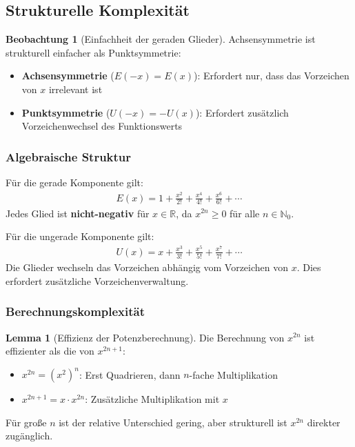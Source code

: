 ﻿\documentclass[a4paper,12pt]{article}
\theoremstyle{definition}
\newtheorem{lemma}{Lemma}
\newtheorem{beobachtung}{Beobachtung}
\begin{document}
\subsection{Strukturelle Komplexität}

\begin{beobachtung}[Einfachheit der geraden Glieder]
Achsensymmetrie ist strukturell einfacher als Punktsymmetrie:
\begin{itemize}
  \item[-] \textbf{Achsensymmetrie} ($E(-x) = E(x)$): Erfordert nur, dass das
           Vorzeichen von $x$ irrelevant ist
  \item[-] \textbf{Punktsymmetrie} ($U(-x) = -U(x)$): Erfordert zusätzlich
           Vorzeichenwechsel des Funktionswerts
\end{itemize}
\end{beobachtung}

\subsubsection{Algebraische Struktur}

Für die gerade Komponente gilt:
\begin{align}
  E(x) = 1 + \frac{x^2}{2!} + \frac{x^4}{4!} + \frac{x^6}{6!} + \cdots
\end{align}
Jedes Glied ist \textbf{nicht-negativ} für $x \in \mathbb{R}$, da
$x^{2n} \geq 0$ für alle $n \in \mathbb{N}_0$.

Für die ungerade Komponente gilt:
\begin{align}
  U(x) = x + \frac{x^3}{3!} + \frac{x^5}{5!} + \frac{x^7}{7!} + \cdots
\end{align}
Die Glieder wechseln das Vorzeichen abhängig vom Vorzeichen von $x$.
Dies erfordert zusätzliche Vorzeichenverwaltung.

\subsubsection{Berechnungskomplexität}

\begin{lemma}[Effizienz der Potenzberechnung]
Die Berechnung von $x^{2n}$ ist effizienter als die von $x^{2n+1}$:
\begin{itemize}
  \item[-] $x^{2n} = (x^2)^n$: Erst Quadrieren, dann $n$-fache Multiplikation
  \item[-] $x^{2n+1} = x \cdot x^{2n}$: Zusätzliche Multiplikation mit $x$
\end{itemize}
Für große $n$ ist der relative Unterschied gering, aber strukturell ist
$x^{2n}$ direkter zugänglich.
\end{lemma}
\end{document}
